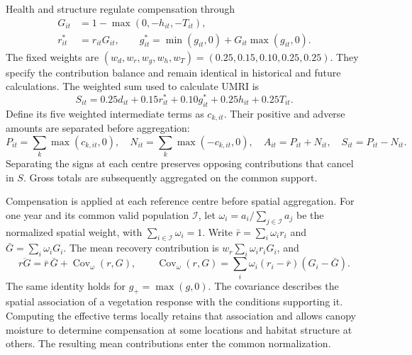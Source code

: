 Health and structure regulate compensation through
\begin{align}
G_{it}&=1-\max(0,-h_{it},-T_{it}),\label{eq:si_gate}\\
r^\ast_{it}&=r_{it}G_{it},\qquad
g^\ast_{it}=\min(g_{it},0)+G_{it}\max(g_{it},0).\label{eq:si_effective}
\end{align}
The fixed weights are $(w_d,w_r,w_g,w_h,w_T)=(0.25,0.15,0.10,0.25,0.25)$. They specify the contribution balance and remain identical in historical and future calculations. The weighted sum used to calculate UMRI is
\begin{equation}\label{eq:si_score}
S_{it}=0.25d_{it}+0.15r^\ast_{it}+0.10g^\ast_{it}+0.25h_{it}+0.25T_{it}.
\end{equation}
Define its five weighted intermediate terms as $c_{k,it}$. Their positive and adverse amounts are separated before aggregation:
\begin{equation}\label{eq:si_gross}
P_{it}=\sum_k\max(c_{k,it},0),\quad
N_{it}=\sum_k\max(-c_{k,it},0),\quad
A_{it}=P_{it}+N_{it},\quad S_{it}=P_{it}-N_{it}.
\end{equation}
Separating the signs at each centre preserves opposing contributions that cancel in $S$. Gross totals are subsequently aggregated on the common support.

Compensation is applied at each reference centre before spatial aggregation. For one year and its common valid population $\mathcal I$, let $\omega_i=a_i/\sum_{j\in\mathcal I}a_j$ be the normalized spatial weight, with $\sum_{i\in\mathcal I}\omega_i=1$. Write $\bar r=\sum_i\omega_i r_i$ and $\bar G=\sum_i\omega_i G_i$. The mean recovery contribution is $w_r\sum_i\omega_i r_iG_i$, and
\[
\overline{rG}=\bar r\,\bar G+\operatorname{Cov}_{\omega}(r,G),\qquad
\operatorname{Cov}_{\omega}(r,G)=\sum_i\omega_i(r_i-\bar r)(G_i-\bar G).
\]
The same identity holds for $g_+=\max(g,0)$. The covariance describes the spatial association of a vegetation response with the conditions supporting it. Computing the effective terms locally retains that association and allows canopy moisture to determine compensation at some locations and habitat structure at others. The resulting mean contributions enter the common normalization.

